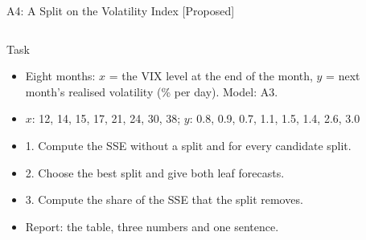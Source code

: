 \begin{frame}{A4: A Split on the Volatility Index [Proposed]}
\propsub
\itemsize{\scriptsize}
\begin{columns}[T]
\begin{column}{\taskw}
\begin{block}{Task}
\begin{itemize}
    \item Eight months: $x$ = the VIX level at the end of the month, $y$ = next month's realised volatility (\% per day). Model: A3.
    \item $x$: 12, 14, 15, 17, 21, 24, 30, 38; $y$: 0.8, 0.9, 0.7, 1.1, 1.5, 1.4, 2.6, 3.0
    \item 1. Compute the SSE without a split and for every candidate split.
    \item 2. Choose the best split and give both leaf forecasts.
    \item 3. Compute the share of the SSE that the split removes.
    \item Report: the table, three numbers and one sentence.
\end{itemize}
\end{block}
\end{column}
\begin{column}{\solw}
\end{column}
\end{columns}
\end{frame}

